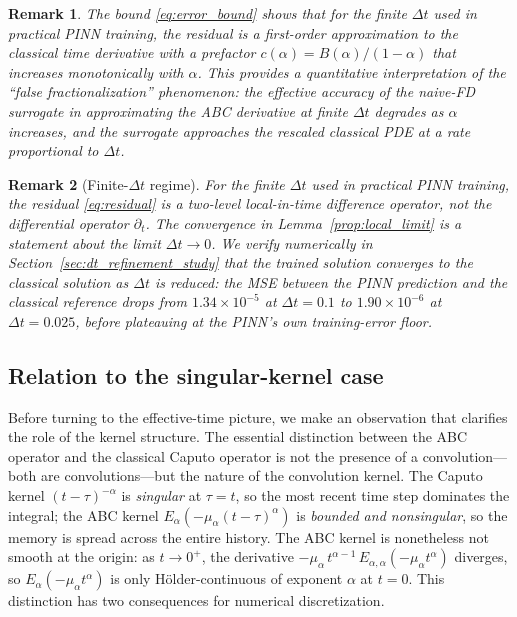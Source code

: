 \documentclass[11pt]{article}
\newtheorem{remark}{Remark}
\begin{document}
\begin{remark}
The bound \eqref{eq:error_bound} shows that for the finite \(\Delta t\) used in practical PINN training, the residual is a first-order approximation to the classical time derivative with a prefactor \(c(\alpha) = B(\alpha)/(1-\alpha)\) that increases monotonically with \(\alpha\). This provides a quantitative interpretation of the ``false fractionalization'' phenomenon: the effective accuracy of the naive-FD surrogate in approximating the ABC derivative at finite \(\Delta t\) degrades as \(\alpha\) increases, and the surrogate approaches the rescaled classical PDE at a rate proportional to \(\Delta t\).
\end{remark}

\begin{remark}[Finite-\(\Delta t\) regime]
\label{rem:finite_dt}
For the finite \(\Delta t\) used in practical PINN training, the residual \eqref{eq:residual} is a two-level local-in-time difference operator, not the differential operator \(\partial_t\). The convergence in Lemma~\ref{prop:local_limit} is a statement about the \emph{limit} \(\Delta t\to 0\). We verify numerically in Section~\ref{sec:dt_refinement_study} that the trained solution converges to the classical solution as \(\Delta t\) is reduced: the MSE between the PINN prediction and the classical reference drops from \(1.34\times 10^{-5}\) at \(\Delta t=0.1\) to \(1.90\times 10^{-6}\) at \(\Delta t=0.025\), before plateauing at the PINN's own training-error floor.
\end{remark}

\subsection{Relation to the singular-kernel case}
\label{sec:operator_structure}

Before turning to the effective-time picture, we make an observation that
clarifies the role of the kernel structure. The essential distinction
between the ABC operator and the classical Caputo operator is not the
presence of a convolution---both are convolutions---but the nature of
the convolution kernel. The Caputo kernel \((t-\tau)^{-\alpha}\) is
\emph{singular} at \(\tau = t\), so the most recent time step dominates
the integral; the ABC kernel
\(E_\alpha(-\mu_\alpha(t-\tau)^\alpha)\) is \emph{bounded and
nonsingular}, so the memory is spread across the entire history.
The ABC kernel is nonetheless not smooth at the origin: as
\(t \to 0^+\), the derivative \(- \mu_\alpha\, t^{\alpha-1}\,
E_{\alpha,\alpha}(-\mu_\alpha t^\alpha)\) diverges, so
\(E_\alpha(-\mu_\alpha t^\alpha)\) is only Hölder-continuous of
exponent \(\alpha\) at \(t = 0\). This
distinction has two consequences for numerical discretization.
\end{document}
